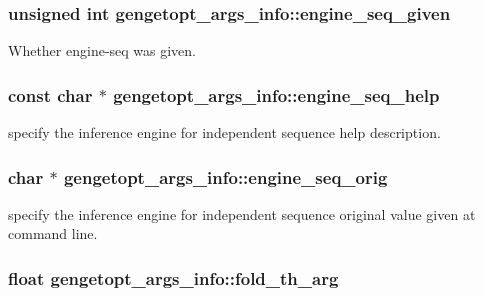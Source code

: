 \hypertarget{structgengetopt__args__info_ab3cefd9fb1ccec8f27e55a6ab1c9acfb}{
\subsubsection[{engine\+\_\+seq\+\_\+given}]{\setlength{\rightskip}{0pt plus 5cm}unsigned int gengetopt\+\_\+args\+\_\+info\+::engine\+\_\+seq\+\_\+given}}\label{structgengetopt__args__info_ab3cefd9fb1ccec8f27e55a6ab1c9acfb}


Whether engine-\/seq was given. 

\hypertarget{structgengetopt__args__info_a49e17a823ee81349a2a9ae841c4efa37}{
\subsubsection[{engine\+\_\+seq\+\_\+help}]{\setlength{\rightskip}{0pt plus 5cm}const char $\ast$ gengetopt\+\_\+args\+\_\+info\+::engine\+\_\+seq\+\_\+help}}\label{structgengetopt__args__info_a49e17a823ee81349a2a9ae841c4efa37}


specify the inference engine for independent sequence help description. 

\hypertarget{structgengetopt__args__info_abe98c49189906e22b3050266037b7a60}{
\subsubsection[{engine\+\_\+seq\+\_\+orig}]{\setlength{\rightskip}{0pt plus 5cm}char $\ast$ gengetopt\+\_\+args\+\_\+info\+::engine\+\_\+seq\+\_\+orig}}\label{structgengetopt__args__info_abe98c49189906e22b3050266037b7a60}


specify the inference engine for independent sequence original value given at command line. 

\hypertarget{structgengetopt__args__info_a7b854a8200daa4d15745ae98b20f30f6}{
\subsubsection[{fold\+\_\+th\+\_\+arg}]{\setlength{\rightskip}{0pt plus 5cm}float gengetopt\+\_\+args\+\_\+info\+::fold\+\_\+th\+\_\+arg}}\label{structgengetopt__args__info_a7b854a8200daa4d15745ae98b20f30f6}


